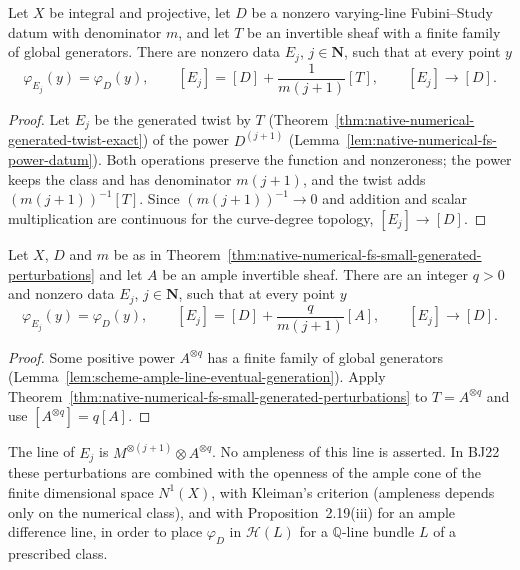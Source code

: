 \begin{theorem}
\label{thm:native-numerical-fs-small-generated-perturbations}
\leanok
{}
Let $X$ be integral and projective, let $D$ be a nonzero varying-line
Fubini--Study datum with denominator $m$, and let $T$ be an invertible sheaf
with a finite family of global generators.  There are nonzero data $E_j$,
$j\in\mathbf N$, such that at every point $y$
\[
 \varphi_{E_j}(y)=\varphi_D(y),\qquad
 [E_j]=[D]+\frac{1}{m(j+1)}[T],\qquad
 [E_j]\longrightarrow[D].
\]
\end{theorem}
\begin{proof}
Let $E_j$ be the generated twist by $T$
(Theorem~\ref{thm:native-numerical-generated-twist-exact}) of the power
$D^{(j+1)}$ (Lemma~\ref{lem:native-numerical-fs-power-datum}).  Both
operations preserve the function and nonzeroness; the power keeps the class
and has denominator $m(j+1)$, and the twist adds $(m(j+1))^{-1}[T]$.  Since
$(m(j+1))^{-1}\to0$ and addition and scalar multiplication are continuous
for the curve-degree topology, $[E_j]\to[D]$.
\end{proof}

\begin{corollary}
\label{cor:native-numerical-fs-small-ample-direction}
\leanok
{}
Let $X$, $D$ and $m$ be as in
Theorem~\ref{thm:native-numerical-fs-small-generated-perturbations} and let
$A$ be an ample invertible sheaf.  There are an integer $q>0$ and nonzero
data $E_j$, $j\in\mathbf N$, such that at every point $y$
\[
 \varphi_{E_j}(y)=\varphi_D(y),\qquad
 [E_j]=[D]+\frac{q}{m(j+1)}[A],\qquad
 [E_j]\longrightarrow[D].
\]
\end{corollary}
\begin{proof}
Some positive power $A^{\otimes q}$ has a finite family of global generators
(Lemma~\ref{lem:scheme-ample-line-eventual-generation}).  Apply
Theorem~\ref{thm:native-numerical-fs-small-generated-perturbations} to
$T=A^{\otimes q}$ and use $[A^{\otimes q}]=q[A]$.
\end{proof}

\begin{remark}
The line of $E_j$ is $M^{\otimes(j+1)}\otimes A^{\otimes q}$.  No ampleness of
this line is asserted.  In BJ22 these perturbations are combined with the
openness of the ample cone of the finite dimensional space $N^1(X)$, with
Kleiman's criterion (ampleness depends only on the numerical class), and
with Proposition~2.19(iii) for an ample difference line, in order to place
$\varphi_D$ in $\mathcal H(L)$ for a $\mathbb Q$-line bundle $L$ of a
prescribed class.
\end{remark}
